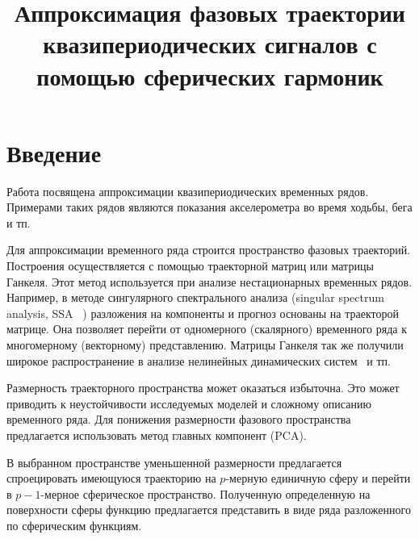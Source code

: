 \documentclass[12pt,twoside]{article}
\title
    [Аппроксимация фазовой траектории] 
    {Аппроксимация фазовых траектории квазипериодических сигналов с помощью сферических гармоник}
\author
    {Тихонов~Д.\,М., Стрижов~В.\,В.} %
\begin{document}
\newcommand{\nsymbol}[2]{\medskip\hangindent=\parindent\hangafter=1\noindent $#1$ --- #2\par}
\newcommand{\nsymbolp}[3]{\nsymbol{#1}{#2 \dotfill\pageref{#3}}}

\newcommand{\hookuparrow}{\mathrel{\rotatebox[origin=t]{270}{$\hookleftarrow$}}}
\newcommand{\hookdownarrow}{\mathrel{\rotatebox[origin=t]{90}{$\hookleftarrow$}}}

\maketitle

\section{Введение}
Работа посвящена аппроксимации квазипериодических временных рядов.
Примерами таких рядов являются показания акселерометра во время ходьбы, бега и тп.
	
Для аппроксимации временного ряда строится пространство фазовых траекторий.
Построения осуществляется с помощью траекторной матриц или матрицы Ганкеля. Этот метод используется при анализе нестационарных временных рядов. Например, в методе сингулярного спектрального анализа (singular spectrum analysis, SSA ~\cite{Golyandina2002}) разложения на компоненты и прогноз основаны на траекторой матрице. Она позволяет перейти от одномерного (скалярного) временного ряда к многомерному (векторному) представлению. Матрицы Ганкеля так же получили широкое распространение в анализе нелинейных динамических систем~\cite{Takens1981} и тп.

Размерность траекторного пространства может оказаться избыточна.
Это может приводить к неустойчивости исследуемых моделей и сложному описанию временного ряда.
Для понижения размерности фазового пространства предлагается использовать  метод главных компонент (PCA).
	
В выбранном пространстве уменьшенной размерности предлагается спроецировать имеющуюся траекторию на $p$-мерную единичную сферу и перейти в $p-1$-мерное сферическое пространство.
Полученную определенную на поверхности сферы функцию предлагается представить в виде ряда разложенного по сферическим функциям.
\end{document}
